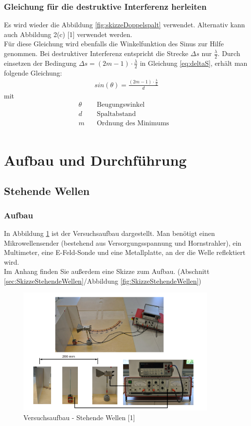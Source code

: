 \documentclass[a4paper]{scrartcl}
\numberwithin{equation}{subsection}
\begin{document}
\subsubsection{Gleichung für die destruktive Interferenz herleiten}
Es wird wieder die Abbildung \ref{fig:skizzeDoppelspalt} verwendet. Alternativ kann auch Abbildung 2(c) [1] verwendet werden.\\
Für diese Gleichung wird ebenfalls die Winkelfunktion des Sinus zur Hilfe genommen. Bei destruktiver Interferenz entspricht die Strecke $\Delta s$ nur $\frac{\lambda}{2}$. Durch einsetzen der Bedingung $\Delta s = (2m-1) \cdot \frac{\lambda}{2}$ in Gleichung \ref{eq:deltaS}, erhält man folgende Gleichung:
\begin{align}
\label{eq:destrutiveInterferenz}
sin(\theta)=\frac{(2m-1) \cdot \frac{\lambda}{2}}{d}
\end{align}
mit
\begin{align*}
\theta \quad &\text{Beugungswinkel}&\\
d \quad &\text{Spaltabstand}&\\
m \quad &\text{Ordnung des Minimums}&\\
\end{align*}

\newpage

\section{Aufbau und Durchführung}
\subsection{Stehende Wellen}
\subsubsection{Aufbau}
In Abbildung \ref{fig:AufbauStehendeWellen} ist der Versuchsaufbau dargestellt. Man benötigt einen Mikrowellensender (bestehend aus Versorgungsspannung und Hornstrahler), ein Multimeter, eine E-Feld-Sonde und eine Metallplatte, an der die Welle reflektiert wird.\\
Im Anhang finden Sie außerdem eine Skizze zum Aufbau. (Abschnitt \ref{sec:SkizzeStehendeWellen}/Abbildung \ref{fig:SkizzeStehendeWellen})

\begin{figure}[H]
\includegraphics[width=10cm]{Aufbau_Stehende_Wellen}
\centering
\caption{Versuchsaufbau - Stehende Wellen [1]}
\centering
\label{fig:AufbauStehendeWellen}
\end{figure}
\end{document}
